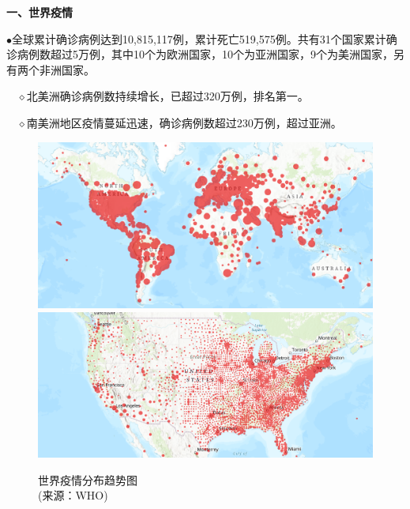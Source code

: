 \documentclass[
]{article}
\begin{document}
\begin{huge}{\textcolor{glaucous}{\textbf {一、世界疫情}}}\end{huge}

\vspace{-5mm}

\(\bullet\)全球累计确诊病例达到10,815,117例，累计死亡519,575例。共有31个国家累计确诊病例数超过5万例，其中10个为欧洲国家，10个为亚洲国家，9个为美洲国家，另有两个非洲国家。

\(\quad\)\(\diamond\)北美洲确诊病例数持续增长，已超过320万例，排名第一。

\(\quad\)\(\diamond\)南美洲地区疫情蔓延迅速，确诊病例数超过230万例，超过亚洲。

\begin{figure}[H]
\caption{世界疫情分布趋势图\\ \vspace{-3mm}(来源：WHO)} %
\centering
\includegraphics[]{./input/covid1.png} %
\includegraphics[]{./input/covid4.png}
\label{} %
\end{figure}
\end{document}
